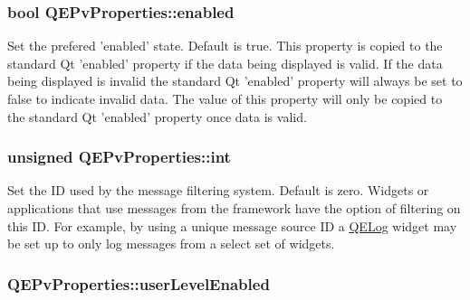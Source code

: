 \hypertarget{classQEPvProperties_a89fe9ff0954fac3081a0f5dd3493a98b}{
\subsubsection[{enabled}]{\setlength{\rightskip}{0pt plus 5cm}bool QEPvProperties::enabled}}
\label{classQEPvProperties_a89fe9ff0954fac3081a0f5dd3493a98b}
Set the prefered 'enabled' state. Default is true. This property is copied to the standard Qt 'enabled' property if the data being displayed is valid. If the data being displayed is invalid the standard Qt 'enabled' property will always be set to false to indicate invalid data. The value of this property will only be copied to the standard Qt 'enabled' property once data is valid. \hypertarget{classQEPvProperties_a7b8252acba093bdeffd6e60a33484b32}{
\subsubsection[{int}]{\setlength{\rightskip}{0pt plus 5cm}unsigned QEPvProperties::int}}
\label{classQEPvProperties_a7b8252acba093bdeffd6e60a33484b32}
Set the ID used by the message filtering system. Default is zero. Widgets or applications that use messages from the framework have the option of filtering on this ID. For example, by using a unique message source ID a \hyperlink{classQELog}{QELog} widget may be set up to only log messages from a select set of widgets. \hypertarget{classQEPvProperties_af97fe8a974987d11ba381862c9688797}{
\subsubsection[{userLevelEnabled}]{ QEPvProperties::userLevelEnabled}}
\label{classQEPvProperties_af97fe8a974987d11ba381862c9688797}
